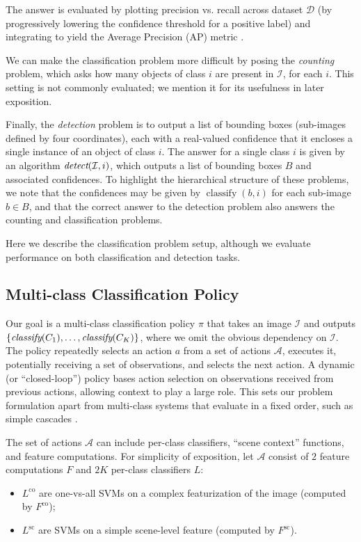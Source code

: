\documentclass[runningheads]{llncs}
\begin{document}
The answer is evaluated by plotting precision vs. recall across dataset $\mathcal{D}$ (by progressively lowering the confidence threshold for a positive label) and integrating to yield the Average Precision (AP) metric \cite{pascal-voc-2010}.

We can make the classification problem more difficult by posing the \emph{counting} problem, which asks how many objects of class $i$ are present in $\mathcal{I}$, for each $i$.
This setting is not commonly evaluated; we mention it for its usefulness in later exposition.

Finally, the \emph{detection} problem is to output a list of bounding boxes (sub-images defined by four coordinates), each with a real-valued confidence that it encloses a single instance of an object of class $i$.
The answer for a single class $i$ is given by an algorithm $\emph{detect}(\mathcal{I},i)$, which outputs a list of bounding boxes $B$ and associated confidences.
To highlight the hierarchical structure of these problems, we note that the confidences may be given by $\operatorname{classify}(b,i)$ for each sub-image $b \in B$, and that the correct answer to the detection problem also answers the counting and classification problems.

Here we describe the classification problem setup, although we evaluate performance on both classification and detection tasks.

\subsection{Multi-class Classification Policy}

Our goal is a multi-class classification policy $\pi$ that takes an image $\mathcal{I}$ and outputs $\{\emph{classify}(C_1), \dots, \emph{classify}(C_K)\}$, where we omit the obvious dependency on $\mathcal{I}$.
The policy repeatedly selects an action $a$ from a set of actions $\mathcal{A}$, executes it, potentially receiving a set of observations, and selects the next action.
A dynamic (or ``closed-loop'') policy bases action selection on observations received from previous actions, allowing context to play a large role.
This sets our problem formulation apart from multi-class systems that evaluate in a fixed order, such as simple cascades \cite{Viola2001}.

The set of actions $\mathcal{A}$ can include per-class classifiers, ``scene context'' functions, and feature computations.
For simplicity of exposition, let $\mathcal{A}$ consist of $2$ feature computations $F$ and $2K$ per-class classifiers $L$:
\begin{itemize}
	\item $L^\text{co}$ are one-vs-all SVMs on a complex featurization of the image (computed by $F^\text{co}$);
	\item $L^\text{sc}$ are SVMs on a simple scene-level feature (computed by $F^\text{sc}$).
\end{itemize}
\end{document}
